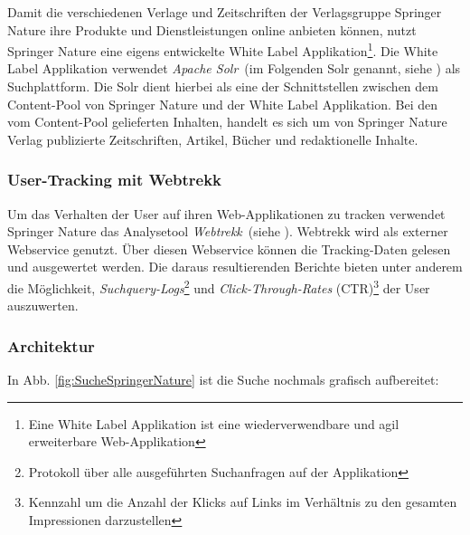 Damit die verschiedenen Verlage und Zeitschriften der Verlagsgruppe Springer Nature ihre Produkte und Dienstleistungen online anbieten können, nutzt Springer Nature eine eigens entwickelte White Label Applikation\footnote{Eine White Label Applikation ist eine wiederverwendbare und agil erweiterbare Web-Applikation}. Die White Label Applikation verwendet \textit{Apache Solr}~(im Folgenden \glqq Solr\grqq{} genannt, siehe \cite{solr}) als Suchplattform. Die Solr dient hierbei als eine der Schnittstellen zwischen dem Content-Pool von Springer Nature und der White Label Applikation. Bei den vom Content-Pool gelieferten Inhalten, handelt es sich um von Springer Nature Verlag publizierte Zeitschriften, Artikel, Bücher und redaktionelle Inhalte.

\subsubsection{User-Tracking mit Webtrekk}
\label{sec:Einfuehrung:AufbauSucheBeiSpringerNature:Webtrekk}

Um das Verhalten der User auf ihren Web-Applikationen zu tracken verwendet Springer Nature das Analysetool \textit{Webtrekk}~(siehe \cite{webtrekk}). Webtrekk wird als externer Webservice genutzt. Über diesen Webservice können die Tracking-Daten gelesen und ausgewertet werden. Die daraus resultierenden Berichte bieten unter anderem die Möglichkeit, \textit{Suchquery-Logs}\footnote{Protokoll über alle ausgeführten Suchanfragen auf der Applikation} und \textit{Click-Through-Rates} (CTR)\footnote{Kennzahl um die Anzahl der Klicks auf Links im Verhältnis zu den gesamten Impressionen darzustellen} der User auszuwerten.

\pagebreak

\subsubsection{Architektur}
\label{sec:Einfuehrung:AufbauSucheBeiSpringerNature:Architektur}

In Abb. \ref{fig:SucheSpringerNature} ist die Suche nochmals grafisch aufbereitet:

